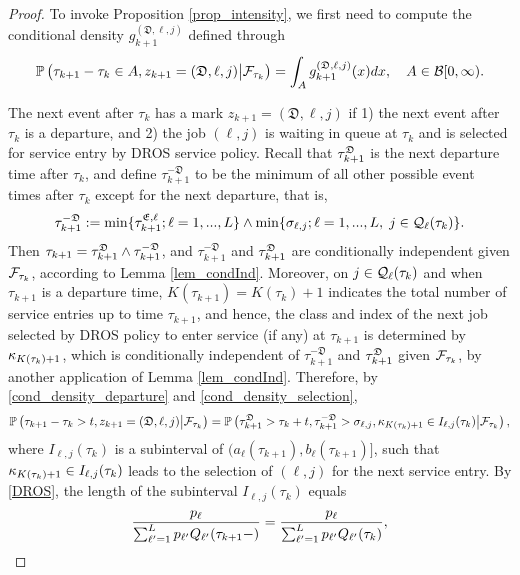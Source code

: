 \documentclass{article}
\theoremstyle{definition}
\numberwithin{equation}{section}
\begin{document}
\begin{proof}
To invoke Proposition \ref{prop_intensity}, we first need to compute the conditional density $g^{(\mathfrak{D},\ell,j)}_{k+1}$ defined through
\begin{equation}\label{prelim_gek_eq2}
\mathbb{P}\left(\tau_{k+1}-\tau_{k}\in A, z_{k+1}=(\mathfrak{D},\ell,j)\big|\mathcal{F}_{\tau_k}\right)= \int_A g^{(\mathfrak{D},\ell,j)}_{k+1}(x) dx,\quad  A\in\mathcal{B}[0,\infty).
\end{equation}


The next event after $\tau_k$ has a mark $z_{k+1}=(\mathfrak{D},\ell,j)$ if 1) the next event after $\tau_k$ is a departure, and 2) the job $(\ell,j)$ is waiting in queue at $\tau_k$ and is selected for service entry by DROS service policy. Recall that $\tau^{\mathfrak{D}}_{k+1}$ is the next departure time after $\tau_k$, and define $\tau_{k+1}^{-\mathfrak{D}}$  to be the minimum of all other possible event times after $\tau_k$ except for the next departure, that is,
\[
  \tau_{k+1}^{-\mathfrak{D}} := \min\{\tau^{\mathfrak{E},\ell}_{k+1};\ell=1,...,L\} \wedge \min\{\sigma_{\ell,j}; \ell=1,...,L,\;j\in\mathcal{Q}_{\ell}(\tau_k)\}.
\]
Then $\tau_{k+1}= \tau^{\mathfrak{D}}_{k+1}\wedge\tau_{k+1}^{-\mathfrak{D}}$, and $\tau_{k+1}^{-\mathfrak{D}}$ and $\tau^{\mathfrak{D}}_{k+1}$ are conditionally independent given $\mathcal{F}_{\tau_k}$, according to Lemma \ref{lem_condInd}. Moreover, on $j\in\mathcal{Q}_{\ell}(\tau_k)$ and when $\tau_{k+1}$ is a departure time, $K(\tau_{k+1})=K(\tau_k)+1$ indicates the total number of service entries up to time $\tau_{k+1}$, and hence, the class and index of the next job selected by DROS policy to enter service (if any) at $\tau_{k+1}$  is determined by $\kappa_{K(\tau_{k})+1}$, which is conditionally independent of $\tau_{k+1}^{-\mathfrak{D}}$ and $\tau^{\mathfrak{D}}_{k+1}$  given $\mathcal{F}_{\tau_k}$, by another application of Lemma \ref{lem_condInd}. Therefore, by \eqref{cond_density_departure} and \eqref{cond_density_selection},
\[
\mathbb{P}\left(\tau_{k+1}-\tau_{k}>t, z_{k+1}=(\mathfrak{D},\ell,j)\big|\mathcal{F}_{\tau_k}\right) = \mathbb{P}\left(\tau^{\mathfrak{D}}_{k+1}>\tau_k+t,\tau_{k+1}^{-\mathfrak{D}}>\sigma_{\ell,j} , \kappa_{K(\tau_k)+1}\in I_{\ell,j}(\tau_k) \big|\mathcal{F}_{\tau_k}\right),
\]
where $I_{\ell,j}(\tau_k)$ is a subinterval of $(a_\ell(\tau_{k+1}),b_\ell(\tau_{k+1})]$, such that $\kappa_{K(\tau_k)+1}\in I_{\ell,j}(\tau_k)$ leads to the selection of $(\ell,j)$ for the next service entry. By \eqref{DROS}, the length of the subinterval $I_{\ell,j}(\tau_k)$ equals
\[
\frac{p_\ell}{\sum_{\ell'=1}^{L}p_{\ell'}Q_{\ell'}(\tau_{k+1}-)} =\frac{p_\ell}{\sum_{\ell'=1}^{L}p_{\ell'}Q_{\ell'}(\tau_k)},
\]
\end{proof}
\end{document}
